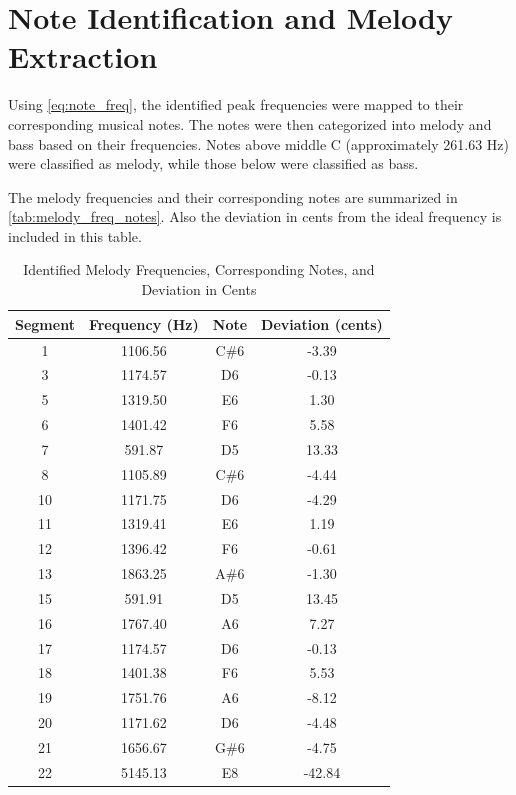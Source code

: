 \section{Note Identification and Melody Extraction}

Using \autoref{eq:note_freq}, the identified peak frequencies were mapped to their corresponding musical notes. The notes were then categorized into melody and bass based on their frequencies. Notes above middle C (approximately 261.63 Hz) were classified as melody, while those below were classified as bass.

The melody frequencies and their corresponding notes are summarized in \autoref{tab:melody_freq_notes}. Also the deviation in cents from the ideal frequency is included in this table.

\begin{table}[H]
    \centering
    \caption{Identified Melody Frequencies, Corresponding Notes, and Deviation in Cents}
    \begin{tabular}{cccc}
        \hline
        Segment & Frequency (Hz) & Note & Deviation (cents) \\
        \hline
        1  & 1106.56 & C\#6  & -3.39   \\
        3  & 1174.57 & D6    & -0.13   \\
        5  & 1319.50 & E6    & 1.30    \\
        6  & 1401.42 & F6    & 5.58    \\
        7  & 591.87  & D5    & 13.33   \\
        8  & 1105.89 & C\#6  & -4.44   \\
        10 & 1171.75 & D6    & -4.29   \\
        11 & 1319.41 & E6    & 1.19    \\
        12 & 1396.42 & F6    & -0.61   \\
        13 & 1863.25 & A\#6  & -1.30   \\
        15 & 591.91  & D5    & 13.45   \\
        16 & 1767.40 & A6    & 7.27    \\
        17 & 1174.57 & D6    & -0.13   \\
        18 & 1401.38 & F6    & 5.53    \\
        19 & 1751.76 & A6    & -8.12   \\
        20 & 1171.62 & D6    & -4.48   \\
        21 & 1656.67 & G\#6  & -4.75   \\
        22 & 5145.13 & E8    & -42.84  \\

\end{tabular}
\end{table}

